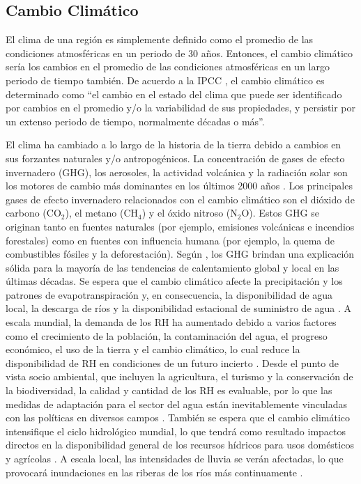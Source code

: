 \documentclass[12pt]{article}
\begin{document}
\subsection{Cambio Climático}

El clima de una región es simplemente definido como el promedio de las condiciones atmosféricas en un periodo de 30 años. Entonces, el cambio climático sería los cambios en el promedio de las condiciones atmosféricas en un largo periodo de tiempo también. De acuerdo a la IPCC \citep{IPCC2007}, el cambio climático es determinado como ``el cambio en el estado del clima que puede ser identificado por cambios en el promedio y/o la variabilidad de sus propiedades, y persistir por un extenso periodo de tiempo, normalmente décadas o más”.

El clima ha cambiado a lo largo de la historia de la tierra debido a cambios en sus forzantes naturales y/o antropogénicos. La concentración de gases de efecto invernadero (GHG), los aerosoles, la actividad volcánica y la radiación solar son los motores de cambio más dominantes en los últimos 2000 años \citep{NRC2006}. Los principales gases de efecto invernadero relacionados con el cambio climático son el dióxido de carbono (CO$_{2}$), el metano (CH$_{4}$) y el óxido nitroso (N$_{2}$O). Estos GHG se originan tanto en fuentes naturales (por ejemplo, emisiones volcánicas e incendios forestales) como en fuentes con influencia humana (por ejemplo, la quema de combustibles fósiles y la deforestación). Según \citet{Solomon2007}, los GHG brindan una explicación sólida para la mayoría de las tendencias de calentamiento global y local en las últimas décadas. Se espera que el cambio climático afecte la precipitación y los patrones de evapotranspiración \citep{Tsanis2011} y, en consecuencia, la disponibilidad de agua local, la descarga de ríos y la disponibilidad estacional de suministro de agua \citep{Arnell2011}. 
\clearpage
A escala mundial, la demanda de los RH ha aumentado debido a varios factores como el crecimiento de la población, la contaminación del agua, el progreso económico, el uso de la tierra y el cambio climático, lo cual reduce la disponibilidad de RH en condiciones de un futuro incierto \citep{Davies2011}. Desde el punto de vista socio ambiental, que incluyen la agricultura, el turismo y la conservación de la biodiversidad, la calidad y cantidad de los RH es evaluable, por lo que las medidas de adaptación para el sector del agua están inevitablemente vinculadas con las políticas en diversos campos \citep{Field2014}. También se espera que el cambio climático intensifique el ciclo hidrológico mundial, lo que tendrá como resultado impactos directos en la disponibilidad general de los recursos hídricos para usos domésticos y agrícolas \citep{Huntington2006}. A escala local, las intensidades de lluvia se verán afectadas, lo que provocará inundaciones en las riberas de los ríos más continuamente \citep{Wilby2010}.
\end{document}
